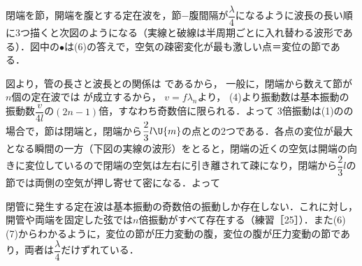 \begin{reidaiunit}
\begin{kaitou}
\begin{komon}
 閉端を節，開端を腹とする定在波を，節−腹間隔が$\dfrac{\lambda}{4}$になるように波長の長い順に3つ描くと次図のようになる（実線と破線は半周期ごとに入れ替わる波形である）．図中の$\bullet$は(6)の答えで，空気の疎密変化が最も激しい点＝{\gtfamily 変位の節}である．
       \begin{center}\end{center}
 図より，管の長さと波長との関係は
       であるから，
 一般に，閉端から数えて節が$n$個の定在波では
       が成立するから，
 $v=f\lambda_n$より，
 (4)より振動数は基本振動の振動数$\dfrac{v}{4l}$の$(2n-1)$倍，すなわち{\gtfamily 奇数倍}に限られる．よって
 3倍振動は(1)のの場合で，節は閉端と，閉端から$\dfrac{2}{3}l\U{m}$の点との2つである．各点の変位が最大となる瞬間の一方（下図の実線の波形）をとると，閉端の近くの空気は開端の向きに変位しているので閉端の空気は左右に引き離されて{\gtfamily 疎}になり，閉端から$\dfrac{2}{3}l$の節では両側の空気が押し寄せて{\gtfamily 密}になる．よって
       \begin{center}\end{center}
\end{komon}
\end{kaitou}
\begin{chuu}
閉管に発生する定在波は{\gtfamily 基本振動の奇数倍の振動しか存在しない}．これに対し，開管や両端を固定した弦では$n$倍振動がすべて存在する（練習［25］）．また(6)(7)からわかるように，{\gtfamily 変位の節が圧力変動の腹}，{\gtfamily 変位の腹が圧力変動の節}であり，両者は$\dfrac{\lambda}{4}$だけずれている．
\end{chuu}
\end{reidaiunit}

